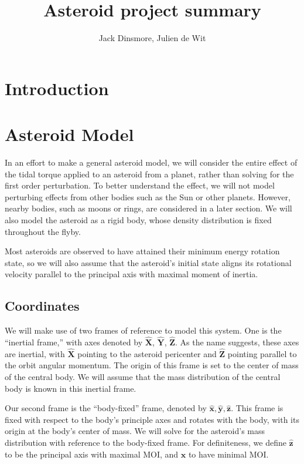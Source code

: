 \documentclass[11pt]{article}
\begin{document}
\title{Asteroid project summary}
\author{Jack Dinsmore, Julien de Wit}

\newcommand{\unit}[1]{\hat{\mathbf{#1}}}
\newcommand{\parens}[1]{\left( #1 \right)}
\newcommand{\brackets}[1]{\left[ #1 \right]}
\newcommand{\jtd}[1]{{\color{red}\textit{#1}}}
\usetikzlibrary{arrows.meta}

\maketitle

\section{Introduction}

\section{Asteroid Model}
In an effort to make a general asteroid model, we will consider the entire effect of the tidal torque applied to an asteroid from a planet, rather than solving for the first order perturbation. To better understand the effect, we will not model perturbing effects from other bodies such as the Sun or other planets. However, nearby bodies, such as moons or rings, are considered in a later section. We will also model the asteroid as a rigid body, whose density distribution is fixed throughout the flyby.

Most asteroids are observed to have attained their minimum energy rotation state, so we will also assume that the asteroid's initial state aligns its rotational velocity parallel to the principal axis with maximal moment of inertia.

\subsection{Coordinates}
\label{sec:coordinates}
We will make use of two frames of reference to model this system. One is the ``inertial frame,'' with axes denoted by $\unit{X}$, $\unit{Y}$, $\unit{Z}$. As the name suggests, these axes are inertial, with $\unit{X}$ pointing to the asteroid pericenter and $\unit{Z}$ pointing parallel to the orbit angular momentum. The origin of this frame is set to the center of mass of the central body. We will assume that the mass distribution of the central body is known in this inertial frame.

Our second frame is the ``body-fixed'' frame, denoted by $\unit{x}, \unit{y}, \unit{z}$. This frame is fixed with respect to the body's principle axes and rotates with the body, with its origin at the body's center of mass. We will solve for the asteroid's mass distribution with reference to the body-fixed frame. For definiteness, we define $\unit{z}$ to be the principal axis with maximal MOI, and $\unit{x}$ to have minimal MOI.
\end{document}
